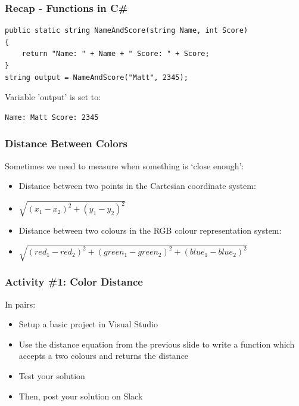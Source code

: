 \begin{frame}[fragile]
	\frametitle{Recap - Functions in C\#}
	
	\begin{lstlisting}
public static string NameAndScore(string Name, int Score) 
{
	return "Name: " + Name + " Score: " + Score;
}		
string output = NameAndScore("Matt", 2345);		

	\end{lstlisting}
Variable 'output' is set to:
	\begin{lstlisting}
Name: Matt Score: 2345		

\end{lstlisting}
	
\end{frame}

\begin{frame}
	\frametitle{Distance Between Colors}
	
	Sometimes we need to measure when something is `close enough':
	
	\begin{itemize}		
		\item Distance between two points in the Cartesian coordinate system:
		\item $\sqrt{(x_{1} - x_{2})^2 + (y_{1} - y_{2})^2}$
		\item Distance between two colours in the RGB colour representation system:
		\item $\sqrt{(red_{1} - red_{2})^2 + (green_{1} - green_{2})^2 + (blue_{1} - blue_{2})^2}$
	\end{itemize}
\end{frame}


\begin{frame}
	\frametitle{Activity \#1: Color Distance}
	
	In pairs:
	
	\vspace{2em}
	
	\begin{itemize}		
		\item Setup a basic project in Visual Studio
		\item Use the distance equation from the previous slide to write a function which accepts a two colours and returns the distance
		\item Test your solution
		\item Then, post your solution on Slack
	\end{itemize}
\end{frame}

